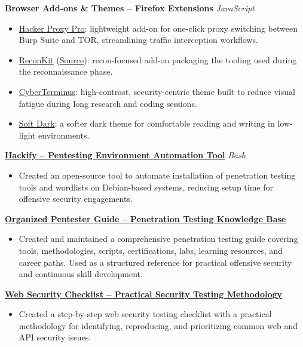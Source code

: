 \documentclass[10pt,a4paper]{article}
\newcommand{\project}[2]{
    \textbf{#1} \hfill \textit{#2}\\[-2pt]
}
\begin{document}
\project{Browser Add-ons \& Themes -- Firefox Extensions}{JavaScript}
\begin{itemize}
    \item \href{https://addons.mozilla.org/en-US/firefox/addon/hackerproxypro/}{Hacker Proxy Pro}: lightweight add-on for one-click proxy switching between Burp Suite and TOR, streamlining traffic interception workflows.
    \item \href{https://addons.mozilla.org/en-US/firefox/addon/reconkit/}{ReconKit} (\href{https://github.com/ZishanAdThandar/reconkit}{Source}): recon-focused add-on packaging the tooling used during the reconnaissance phase.
    \item \href{https://addons.mozilla.org/en-US/firefox/addon/zishanadthandar-cyberterminus/}{CyberTerminus}: high-contrast, security-centric theme built to reduce visual fatigue during long research and coding sessions.
    \item \href{https://addons.mozilla.org/en-US/firefox/addon/soft-dark-zishanadthandar/}{Soft Dark}: a softer dark theme for comfortable reading and writing in low-light environments.
\end{itemize}

\project{\href{https://github.com/ZishanAdThandar/hackify}{Hackify -- Pentesting Environment Automation Tool}}{Bash}
\begin{itemize}
    \item Created an open-source tool to automate installation of penetration testing tools and wordlists on Debian-based systems, reducing setup time for offensive security engagements.
\end{itemize}

\project{\href{https://github.com/ZishanAdThandar/pentest}{Organized Pentester Guide -- Penetration Testing Knowledge Base}}{}
\begin{itemize}
    \item Created and maintained a comprehensive penetration testing guide covering tools, methodologies, scripts, certifications, labs, learning resources, and career paths. Used as a structured reference for practical offensive security and continuous skill development.
\end{itemize}

\project{\href{https://zishanhack.com}{Web Security Checklist -- Practical Security Testing Methodology}}{}
\begin{itemize}
    \item Created a step-by-step web security testing checklist with a practical methodology for identifying, reproducing, and prioritizing common web and API security issues.
\end{itemize}
\end{document}
